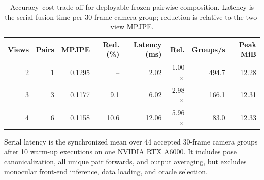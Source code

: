 \begin{table}[t]
\centering
\caption{Accuracy--cost trade-off for deployable frozen pairwise composition. Latency is the serial fusion time per 30-frame camera group; reduction is relative to the two-view MPJPE.}
\label{tab:nview_efficiency}
\footnotesize
\setlength{\tabcolsep}{4pt}
\begin{tabular}{@{}rrrrrrrr@{}}
\toprule
Views & Pairs & MPJPE & Red. (\%) & Latency (ms) & Rel. & Groups/s & Peak MiB \\
\midrule
2 & 1 & 0.1295 & -- & 2.02 & 1.00$\times$ & 494.7 & 12.28 \\
3 & 3 & 0.1177 & 9.1 & 6.02 & 2.98$\times$ & 166.1 & 12.31 \\
4 & 6 & 0.1158 & 10.6 & 12.06 & 5.96$\times$ & 83.0 & 12.33 \\
\bottomrule
\end{tabular}
\vspace{0.3em}
\begin{minipage}{0.97\linewidth}\footnotesize Serial latency is the synchronized mean over 44 accepted 30-frame camera groups after 10 warm-up executions on one NVIDIA RTX A6000. It includes pose canonicalization, all unique pair forwards, and output averaging, but excludes monocular front-end inference, data loading, and oracle selection.\end{minipage}
\end{table}
